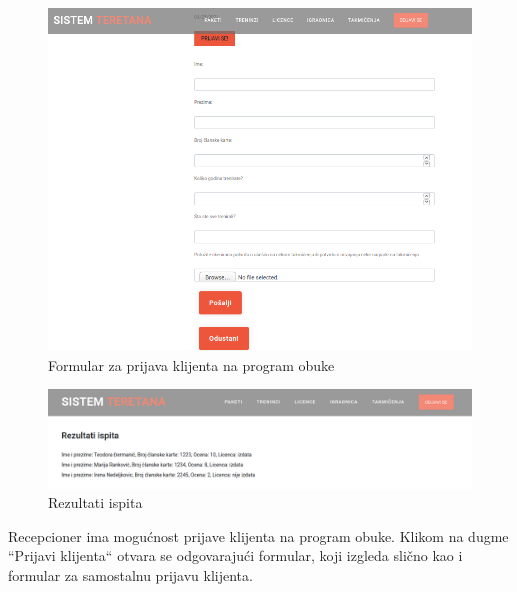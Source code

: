 \begin{figure}[!ht]
\begin{center}
\includegraphics[scale=0.45]{sections/korisnicki_interfejs/screenshots/licenca-klijent-prijava.png}
\end{center}
\caption{Formular za prijava klijenta na program obuke}
\label{fig:licenca_klijent_prijava}
\end{figure}

\begin{figure}[!ht]
\begin{center}
\includegraphics[scale=0.25]{sections/korisnicki_interfejs/screenshots/licenca-klijent-ispiti.png}
\end{center}
\caption{Rezultati ispita}
\label{fig:licenca_klijent_ispiti}
\end{figure}


Recepcioner ima mogućnost prijave klijenta na program obuke. Klikom na dugme ``Prijavi klijenta`` otvara se odgovarajući formular, koji izgleda slično kao i formular za samostalnu prijavu klijenta.